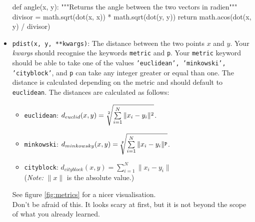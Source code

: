 \begin{itemize}
{\begin{python}
def angle(x, y):
    """Returns the angle between the two vectors in radien"""
    divisor = math.sqrt(dot(x, x)) * math.sqrt(dot(y, y))
		return math.acos(dot(x, y) / divisor)
	\end{python}}
  \item \texttt{pdist(x, y, **kwargs)}: The distance between the two points $x$ and $y$. Your \textit{kwargs} should recognise the keywords \texttt{metric} and \texttt{p}. Your \texttt{metric} keyword should be able to take one of the values \texttt{'euclidean', 'minkowski', 'cityblock'}, and \texttt{p} can take any integer greater or equal than one. The distance is calculated depending on the metric and should default to \texttt{euclidean}. The distances are calculated as follows:
    \begin{itemize}
      \item \texttt{euclidean}: $d_{euclid} (x,y) = \sqrt[\uproot{2}2]{\sum\limits_{i=1}^N \|x_i-y_i\|^2}$.
      \item \texttt{minkowski}: $d_{minkowsky} (x,y) = \sqrt[\uproot{2}\texttt{p}]{\sum\limits_{i=1}^N \|x_i-y_i\|^\texttt{p}}$.
      \item \texttt{cityblock}: $d_{cityblock} (x,y) = \sum\limits_{i=1}^N \|x_i-y_i\|$\\
      (\emph{Note:} $\|x\|$ is the absolute value.)
    \end{itemize}
    See figure \ref{fig:metrics} for a nicer visualisation.\\
    Don't be afraid of this. It looks scary at first, but it is not beyond the scope of what you already learned.
\cprotect{}
\end{itemize}
